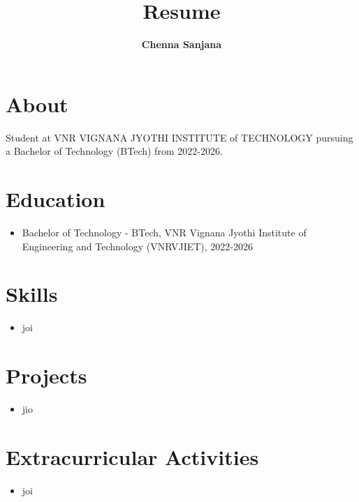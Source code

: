 \documentclass[a4paper, 12pt]{article}
\begin{document}
    \title{\textbf{Resume}}
    \author{\textbf{Chenna Sanjana}}
    \date{}
    \maketitle                          

        \section*{About}
        Student at VNR VIGNANA JYOTHI INSTITUTE of TECHNOLOGY pursuing a Bachelor of Technology (BTech) from 2022-2026.
	
	
        \section*{Education}
        \begin{itemize}
        \item Bachelor of Technology - BTech, VNR Vignana Jyothi Institute of Engineering and Technology (VNRVJIET), 2022-2026
        \end{itemize}
		
	
	\section*{Skills}
	\begin{itemize}
	\item joi
	\end{itemize}

        \section*{Projects}
        \begin{itemize}
        \item jio
        \end{itemize}

        \section*{Extracurricular Activities}
        \begin{itemize}
        \item joi
        \end{itemize}


	 
   
    
\end{document}
